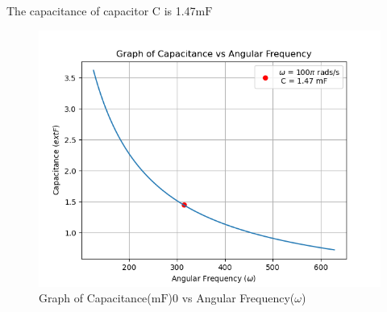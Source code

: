 \documentclass[a4,12pt,onecolumn]{IEEEtran}
\begin{document}
The capacitance of capacitor $\text{C}$ is 1.47$\text{mF}$
\begin{figure}[ht!]
\includegraphics[width=\columnwidth]{fig/fig3.png}
\caption{Graph of Capacitance($\text{mF}$)0 vs Angular Frequency($\omega$)}
\end{figure}
\end{document}
